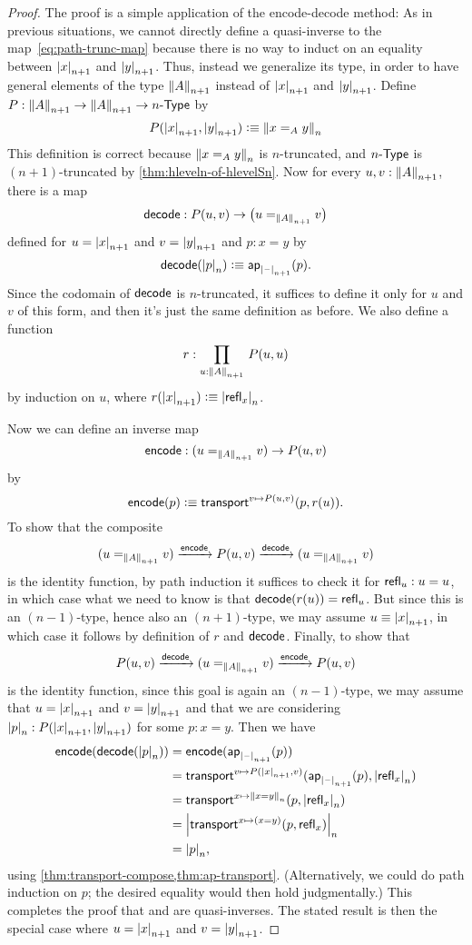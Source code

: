 \begin{proof}
  The proof is a simple application of the encode-decode method:
  As in previous situations, we cannot directly define a quasi-inverse to the map~\eqref{eq:path-trunc-map} because there is no way to induct on an
equality between $\tproj {n+1}x$ and $\tproj {n+1}y$.
  Thus, instead we generalize its type, in order to have general elements of the type $\trunc{n+1}A$ instead of $\tproj {n+1}x$ and $\tproj
{n+1}y$.
  Define $P:\trunc {n+1}A\to\trunc {n+1}A\to\typele{n}$ by
  \[P(\tproj {n+1}x,\tproj {n+1}y)\defeq \trunc n{x=_Ay}\]
  This definition is correct because $\trunc n{x=_Ay}$ is $n$-truncated, and $\typele{n}$ is $(n+1)$-truncated by
\cref{thm:hleveln-of-hlevelSn}.
  Now for every $u,v:\trunc{n+1}A$, there is a map
  \[\decode:P(u,v) \to \big(u=_{\trunc{n+1}A}v\big)\]
  defined for $u=\tproj {n+1}x$ and $v=\tproj {n+1}y$ and $p:x=y$ by
  \[\decode(\tproj n{p})\defeq \apfunc{\tprojf{n+1}} (p).\]
  Since the codomain of $\decode$ is $n$-truncated, it suffices to define it only for $u$ and $v$ of this form, and then it's just the same
definition as before.
  We also define a function
  \[ r : \prd{u:\trunc{n+1} A} P(u,u) \]
  by induction on $u$, where $r(\tproj{n+1} x) \defeq \tproj n {\refl x}$.

  Now we can define an inverse map
  \[\encode: (u=_{\trunc{n+1}A}v) \to P(u,v)\]
  by
  \[\encode(p) \defeq \transfib{v\mapsto P(u,v)}{p}{r(u)}. \]
  To show that the composite
  \[ (u=_{\trunc{n+1}A}v) \xrightarrow{\encode} P(u,v) \xrightarrow{\decode} (u=_{\trunc{n+1}A}v) \]
  is the identity function, by path induction it suffices to check it for $\refl u : u=u$, in which case what we need to know is that
$\decode(r(u)) = \refl{u}$.
  But since this is an $(n-1)$-type, hence also an $(n+1)$-type, we may assume $u\jdeq \tproj {n+1} x$, in which case it follows by definition
of $r$ and $\decode$.
  Finally, to show that
  \[ P(u,v) \xrightarrow{\decode} (u=_{\trunc{n+1}A}v) \xrightarrow{\encode} P(u,v) \]
  is the identity function, since this goal is again an $(n-1)$-type, we may assume that $u=\tproj {n+1}x$ and $v=\tproj {n+1}y$ and that we are
considering $\tproj n p:P(\tproj{n+1}x,\tproj{n+1}y)$ for some $p:x=y$.
  Then we have
  \begin{align*}
    \encode(\decode(\tproj n p)) &= \encode(\apfunc{\tprojf{n+1}}(p))\\
    &= \transfib{v\mapsto P(\tproj{n+1}x,v)}{\apfunc{\tprojf{n+1}}(p)}{\tproj n {\refl x}}\\
    &= \transfib{x\mapsto \trunc n{x=y}}{p}{\tproj n {\refl x}}\\
    &= \tproj n {\transfib{x \mapsto (x=y)}{p}{\refl x}}\\
    &= \tproj n p,
  \end{align*}
  using \cref{thm:transport-compose,thm:ap-transport}.
  (Alternatively, we could do path induction on $p$; the desired equality would then hold judgmentally.)
  This completes the proof that \decode and \encode are quasi-inverses.
  The stated result is then the special case where $u=\tproj {n+1}x$ and $v=\tproj {n+1}y$.
\end{proof}

